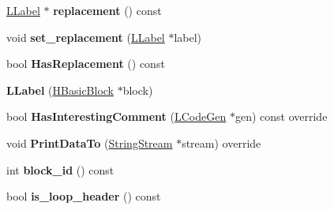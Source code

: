 \begin{DoxyCompactItemize}
\item 
\hyperlink{classv8_1_1internal_1_1_l_label}{L\+Label} $\ast$ {\bfseries replacement} () const \hypertarget{classv8_1_1internal_1_1_l_label_aeae2ce751911693b33505ace069c9f38}{}\label{classv8_1_1internal_1_1_l_label_aeae2ce751911693b33505ace069c9f38}

\item 
void {\bfseries set\+\_\+replacement} (\hyperlink{classv8_1_1internal_1_1_l_label}{L\+Label} $\ast$label)\hypertarget{classv8_1_1internal_1_1_l_label_a05875ed6601582974b107974f2720dc6}{}\label{classv8_1_1internal_1_1_l_label_a05875ed6601582974b107974f2720dc6}

\item 
bool {\bfseries Has\+Replacement} () const \hypertarget{classv8_1_1internal_1_1_l_label_a3215ec5382dd576d965f7ff0e18a7b0e}{}\label{classv8_1_1internal_1_1_l_label_a3215ec5382dd576d965f7ff0e18a7b0e}

\item 
{\bfseries L\+Label} (\hyperlink{classv8_1_1internal_1_1_h_basic_block}{H\+Basic\+Block} $\ast$block)\hypertarget{classv8_1_1internal_1_1_l_label_aa8ea13a89f3934f66742778ba3f83cd4}{}\label{classv8_1_1internal_1_1_l_label_aa8ea13a89f3934f66742778ba3f83cd4}

\item 
bool {\bfseries Has\+Interesting\+Comment} (\hyperlink{classv8_1_1internal_1_1_l_code_gen}{L\+Code\+Gen} $\ast$gen) const  override\hypertarget{classv8_1_1internal_1_1_l_label_aa0a8236af4aaa8c0433e5082df86d31a}{}\label{classv8_1_1internal_1_1_l_label_aa0a8236af4aaa8c0433e5082df86d31a}

\item 
void {\bfseries Print\+Data\+To} (\hyperlink{classv8_1_1internal_1_1_string_stream}{String\+Stream} $\ast$stream) override\hypertarget{classv8_1_1internal_1_1_l_label_ac1318b8f414140c11ee85e3acd00491f}{}\label{classv8_1_1internal_1_1_l_label_ac1318b8f414140c11ee85e3acd00491f}

\item 
int {\bfseries block\+\_\+id} () const \hypertarget{classv8_1_1internal_1_1_l_label_a87739f07ada487049bd402d117ea0bdc}{}\label{classv8_1_1internal_1_1_l_label_a87739f07ada487049bd402d117ea0bdc}

\item 
bool {\bfseries is\+\_\+loop\+\_\+header} () const \hypertarget{classv8_1_1internal_1_1_l_label_a310f97c551f5ab43f42ef04d2b97b349}{}\label{classv8_1_1internal_1_1_l_label_a310f97c551f5ab43f42ef04d2b97b349}


\end{DoxyCompactItemize}
